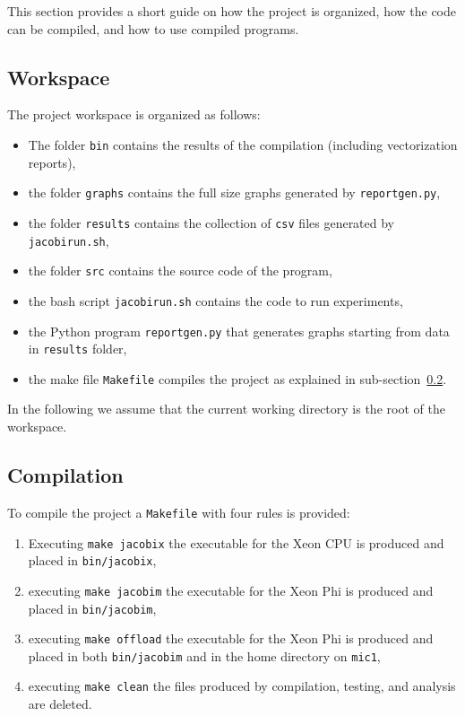 This section provides a short guide on how the project is organized, how the code can be compiled, and how to use compiled programs.

\subsection{Workspace}
The project workspace is organized as follows:
\begin{itemize}
	\item The folder \verb|bin| contains the results of the compilation (including vectorization reports),
	\item the folder \verb|graphs| contains the full size graphs generated by \verb|reportgen.py|,
	\item the folder \verb|results| contains the collection of \verb|csv| files generated by \verb|jacobirun.sh|,
	\item the folder \verb|src| contains the source code of the program,
	\item the bash script \verb|jacobirun.sh| contains the code to run experiments,
	\item the Python program \verb|reportgen.py| that generates graphs starting from data in \verb|results| folder,
	\item the make file \verb|Makefile| compiles the project as explained in sub-section~\ref{subsec:compilation}.
\end{itemize}

In the following we assume that the current working directory is the root of the workspace.

\subsection{Compilation}\label{subsec:compilation}
To compile the project a \verb|Makefile| with four rules is provided:
\begin{enumerate}
	\item Executing \verb|make jacobix| the executable for the Xeon CPU is produced and placed in \verb|bin/jacobix|,
	\item executing \verb|make jacobim| the executable for the Xeon Phi is produced and placed in \verb|bin/jacobim|,
	\item executing \verb|make offload| the executable for the Xeon Phi is produced and placed in both \verb|bin/jacobim| and in the home directory on \verb|mic1|,
	\item executing \verb|make clean| the files produced by compilation, testing, and analysis are deleted.
\end{enumerate}


